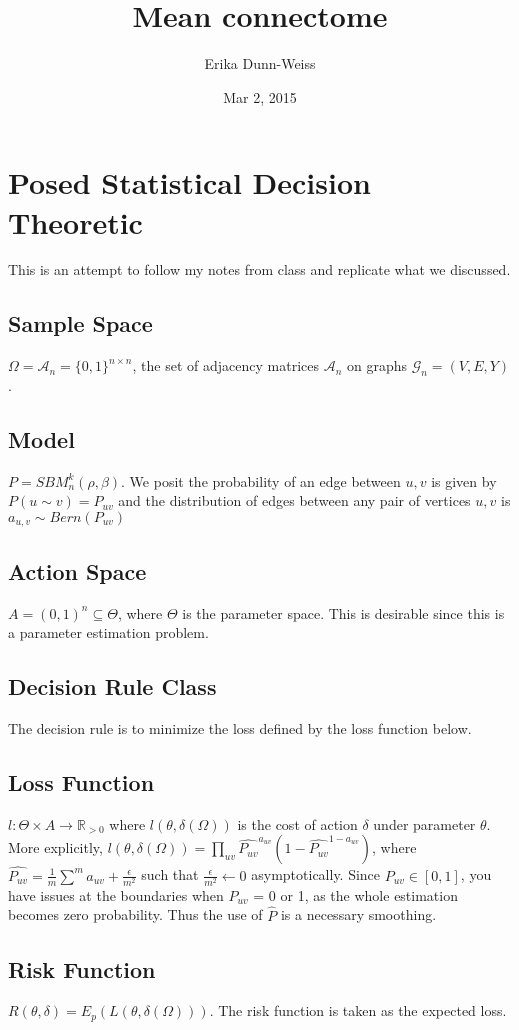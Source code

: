 \documentclass[psamsfonts]{amsart}
\title{Mean connectome}
\author{Erika Dunn-Weiss}
\date{Mar 2, 2015}
\theoremstyle{definition}
\theoremstyle{remark}
\numberwithin{equation}{section}
\begin{document}
\maketitle

\section{Posed Statistical Decision Theoretic}
This is an attempt to follow my notes from class and replicate what we discussed. 

\subsection{Sample Space}
$\Omega = \mathcal{A}_n = \{0,1\}^{n\times n}$, the set of adjacency matrices $\mathcal{A}_n$ on graphs $\mathcal{G}_n = (V,E,Y)$.

\subsection{Model}
$P = SBM^k_n(\rho, \beta)$. We posit the probability of an edge between $u,v$ is given by $P(u \sim v) = P_{uv}$ and the distribution of edges between any pair of vertices $u,v$ is $a_{u,v} \sim Bern(P_{uv})$

\subsection{Action Space}
$A = (0,1)^n \subseteq \Theta$, where $\Theta$ is the parameter space. This is desirable since this is a parameter estimation problem. 

\subsection{Decision Rule Class} 
The decision rule is to minimize the loss defined by the loss function below. 

\subsection{Loss Function}
$l : \Theta \times A \to \mathbb R_{> 0} $ where $l(\theta,\delta(\Omega))$ is the cost of action $\delta$ under parameter $\theta$. More explicitly, $l(\theta, \delta(\Omega)) = \prod_{u v} \hat{P_{uv}} ^{a_{uv}} (1 - \hat{P_{uv}}^{1 - a_{uv}})$, where $\hat{P_{uv}} = \frac{1}{m} \sum^m a_{uv} + \frac{\epsilon}{m^2}$ such that $\frac{\epsilon}{m^2} \leftarrow 0$ asymptotically. Since $P_{uv}\in [0,1]$, you have issues at the boundaries when $P_{u v} $ = 0 or 1, as the whole estimation becomes zero probability. Thus the use of $\hat{P}$ is a necessary smoothing. 

\subsection{Risk Function}
$R(\theta, \delta) = E_{p}(L(\theta,\delta(\Omega)))$. The risk function is taken as the expected loss.



 
 
\end{document}
